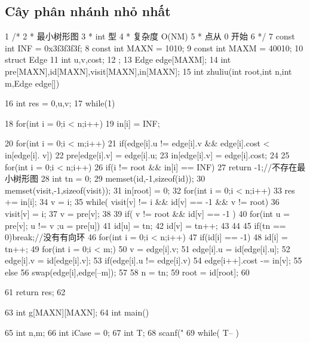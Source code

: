 \documentclass[11pt]{article}
\begin{document}
\subsection{Cây phân nhánh nhỏ nhất}

\begin{Code}
 1    /*
 2     * 最小树形图
 3     * int 型
 4     * 复杂度 O(NM)
 5     * 点从 0 开始
 6     */
 7    const int INF = 0x3f3f3f3f;
 8    const int MAXN = 1010;
 9    const int MAXM = 40010;
10    struct Edge{
11        int u,v,cost;
12    };
13    Edge edge[MAXM];
14    int pre[MAXN],id[MAXN],visit[MAXN],in[MAXN];
15    int zhuliu(int root,int n,int m,Edge edge[]){
16        int res = 0,u,v;
17        while(1){
18            for(int i = 0;i < n;i++)
19                 in[i] = INF;


20              for(int i = 0;i < m;i++)
21                  if(edge[i].u != edge[i].v && edge[i].cost < in[edge[i].
                       v]){
22                      pre[edge[i].v] = edge[i].u;
23                      in[edge[i].v] = edge[i].cost;
24                  }
25              for(int i = 0;i < n;i++)
26                  if(i != root && in[i] == INF)
27                      return -1;//不存在最小树形图
28              int tn = 0;
29              memset(id,-1,sizeof(id));
30              memset(visit,-1,sizeof(visit));
31              in[root] = 0;
32              for(int i = 0;i < n;i++){
33                  res += in[i];
34                  v = i;
35                  while( visit[v] != i && id[v] == -1 && v != root){
36                      visit[v] = i;
37                      v = pre[v];
38                  }
39                  if( v != root && id[v] == -1 ){
40                      for(int u = pre[v]; u != v ;u = pre[u])
41                          id[u] = tn;
42                      id[v] = tn++;
43                  }
44              }
45              if(tn == 0)break;//没有有向环
46              for(int i = 0;i < n;i++)
47                  if(id[i] == -1)
48                      id[i] = tn++;
49              for(int i = 0;i < m;){
50                  v = edge[i].v;
51                  edge[i].u = id[edge[i].u];
52                  edge[i].v = id[edge[i].v];
53                  if(edge[i].u != edge[i].v)
54                      edge[i++].cost -= in[v];
55                  else
56                      swap(edge[i],edge[--m]);
57              }
58              n = tn;
59              root = id[root];
60     }
61     return res;
62 }
63 int g[MAXN][MAXN];
64 int main(){
65     int n,m;
66     int iCase = 0;
67     int T;
68     scanf("%
69     while( T-- ){


}}
\end{Code}
\end{document}
